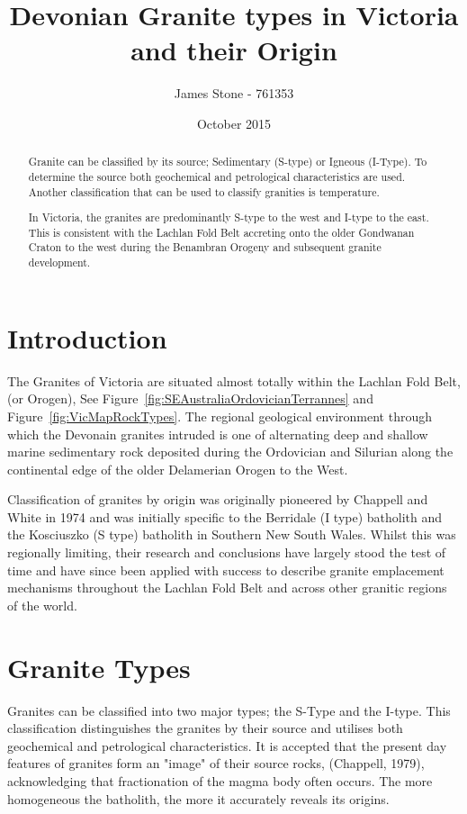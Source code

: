 \documentclass[a4paper]{article}
\title{Devonian Granite types in Victoria and their Origin}
\author{James Stone - 761353}
\date{October 2015}
\begin{document}
\maketitle
\newpage

\begin{abstract}
Granite can be classified by its source; Sedimentary (S-type) or Igneous (I-Type). To determine the source both geochemical and petrological characteristics are used.
Another classification that can be used to classify granities is temperature.

In Victoria, the granites are predominantly S-type to the west and I-type to the east. This is consistent with the Lachlan Fold Belt accreting onto the older Gondwanan Craton to the west during the Benambran Orogeny and subsequent granite development.
\end{abstract}

\section{Introduction}

The Granites of Victoria are situated almost totally within the Lachlan Fold Belt, (or Orogen), See Figure~\ref{fig:SEAustraliaOrdovicianTerrannes} and  Figure~\ref{fig:VicMapRockTypes}. The regional geological environment through which the Devonain granites intruded is one of alternating deep and shallow marine sedimentary rock deposited during the Ordovician and Silurian along the continental edge of the older Delamerian Orogen to the West.

Classification of granites by origin was originally pioneered by Chappell and White in 1974 and was initially specific to the Berridale (I type) batholith and the Kosciuszko (S type) batholith in Southern New South Wales. Whilst this was regionally limiting, their research and conclusions have largely stood the test of time and have since been applied with success to describe granite emplacement mechanisms throughout the Lachlan Fold Belt and across other granitic regions of the world.

\section{Granite Types}

Granites can be classified into two major types; the S-Type and the I-type. \cite{BWChappell}
This classification distinguishes the granites by their source and utilises both geochemical and petrological characteristics. It is accepted that the present day features of granites form an "image" of their source rocks, \cite{BWChappell} (Chappell, 1979), acknowledging that fractionation of the magma body often occurs. The more homogeneous the batholith, the more it accurately reveals its origins. 
\end{document}
